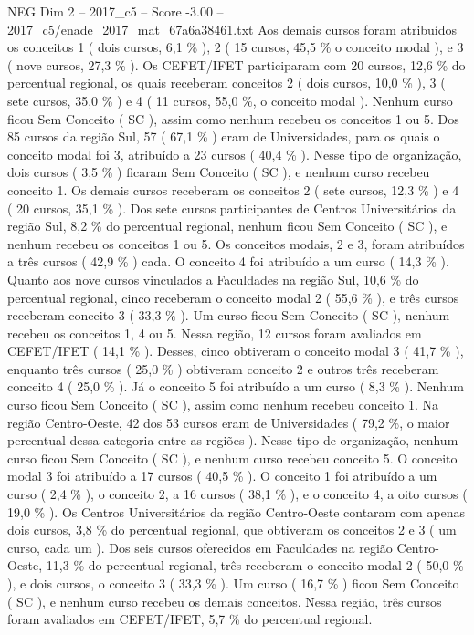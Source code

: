 \begin{textsample}{NEG Dim 2 – 2017\_c5 – Score -3.00 – 2017\_c5/enade\_2017\_mat\_67a6a38461.txt}
Aos demais cursos foram atribuídos os conceitos 1 ( dois cursos, 6,1 \% ), 2 ( 15 cursos, 45,5 \% o conceito modal ), e 3 ( nove cursos, 27,3 \% ).
Os CEFET/IFET participaram com 20 cursos, 12,6 \% do percentual regional, os quais receberam conceitos 2 ( dois cursos, 10,0 \% ), 3 ( sete cursos, 35,0 \% ) e 4 ( 11 cursos, 55,0 \%, o conceito modal ).
Nenhum curso ficou Sem Conceito ( SC ), assim como nenhum recebeu os conceitos 1 ou 5.
Dos 85 cursos da região Sul, 57 ( 67,1 \% ) eram de Universidades, para os quais o conceito modal foi 3, atribuído a 23 cursos ( 40,4 \% ).
Nesse tipo de organização, dois cursos ( 3,5 \% ) ficaram Sem Conceito ( SC ), e nenhum curso recebeu conceito 1.
Os demais cursos receberam os conceitos 2 ( sete cursos, 12,3 \% ) e 4 ( 20 cursos, 35,1 \% ).
Dos sete cursos participantes de Centros Universitários da região Sul, 8,2 \% do percentual regional, nenhum ficou Sem Conceito ( SC ), e nenhum recebeu os conceitos 1 ou 5.
Os conceitos modais, 2 e 3, foram atribuídos a três cursos ( 42,9 \% ) cada.
O conceito 4 foi atribuído a um curso ( 14,3 \% ).
Quanto aos nove cursos vinculados a Faculdades na região Sul, 10,6 \% do percentual regional, cinco receberam o conceito modal 2 ( 55,6 \% ), e três cursos receberam conceito 3 ( 33,3 \% ).
Um curso ficou Sem Conceito ( SC ), nenhum recebeu os conceitos 1, 4 ou 5.
Nessa região, 12 cursos foram avaliados em CEFET/IFET ( 14,1 \% ).
Desses, cinco obtiveram o conceito modal 3 ( 41,7 \% ), enquanto três cursos ( 25,0 \% ) obtiveram conceito 2 e outros três receberam conceito 4 ( 25,0 \% ).
Já o conceito 5 foi atribuído a um curso ( 8,3 \% ).
Nenhum curso ficou Sem Conceito ( SC ), assim como nenhum recebeu conceito 1.
Na região Centro-Oeste, 42 dos 53 cursos eram de Universidades ( 79,2 \%, o maior percentual dessa categoria entre as regiões ).
Nesse tipo de organização, nenhum curso ficou Sem Conceito ( SC ), e nenhum curso recebeu conceito 5.
O conceito modal 3 foi atribuído a 17 cursos ( 40,5 \% ).
O conceito 1 foi atribuído a um curso ( 2,4 \% ), o conceito 2, a 16 cursos ( 38,1 \% ), e o conceito 4, a oito cursos ( 19,0 \% ).
Os Centros Universitários da região Centro-Oeste contaram com apenas dois cursos, 3,8 \% do percentual regional, que obtiveram os conceitos 2 e 3 ( um curso, cada um ).
Dos seis cursos oferecidos em Faculdades na região Centro-Oeste, 11,3 \% do percentual regional, três receberam o conceito modal 2 ( 50,0 \% ), e dois cursos, o conceito 3 ( 33,3 \% ).
Um curso ( 16,7 \% ) ficou Sem Conceito ( SC ), e nenhum curso recebeu os demais conceitos.
Nessa região, três cursos foram avaliados em CEFET/IFET, 5,7 \% do percentual regional.

\end{textsample}
